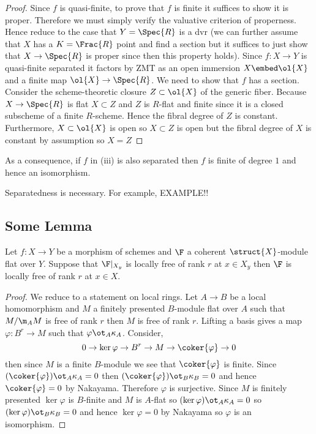\documentclass[12pt]{article}
\begin{document}
\begin{proof}
Since $f$ is quasi-finite, to prove that $f$ is finite it suffices to show it is proper. Therefore we must simply verify the valuative criterion of properness. Hence reduce to the case that $Y = \Spec{R}$ is a dvr (we can further assume that $X$ has a $K = \Frac{R}$ point and find a section but it suffices to just show that $X \to \Spec{R}$ is proper since then this property holds). Since $f : X \to Y$ is quasi-finite separated it factors by ZMT as an open immersion $X \embed \ol{X}$ and a finite map $\ol{X} \to \Spec{R}$. We need to show that $f$ has a section. Consider the scheme-theoretic closure $Z \subset \ol{X}$ of the generic fiber. Because $X \to \Spec{R}$ is flat $X \subset Z$ and $Z$ is $R$-flat and finite since it is a closed subscheme of a finite $R$-scheme. Hence the fibral degree of $Z$ is constant. Furthermore, $X \subset \ol{X}$ is open so $X \subset Z$ is open but the fibral degree of $X$ is constant by assumption so $X = Z$ 
\end{proof}

As a consequence, if $f$ in (iii) is also separated then $f$ is finite of degree $1$ and hence an isomorphism.

\begin{rmk}
Separatedness is necessary. For example, EXAMPLE!!
\end{rmk}

\subsection{Some Lemma}

\begin{lemma}
Let $f : X \to Y$ be a morphism of schemes and $\F$ a coherent $\struct{X}$-module flat over $Y$. Suppose that $\F|_{X_y}$ is locally free of rank $r$ at $x \in X_y$ then $\F$ is locally free of rank $r$ at $x \in X$.
\end{lemma}

\begin{proof}
We reduce to a statement on local rings. Let $A \to B$ be a local homomorphism and $M$ a finitely presented $B$-module flat over $A$ such that $M / \m_A M$ is free of rank $r$ then $M$ is free of rank $r$. Lifting a basis gives a map $\varphi : B^r \to M$ such that $\varphi \ot_A \kappa_A$. Consider,
\[ 0 \to \ker{\varphi} \to B^r \to M \to \coker{\varphi} \to 0 \]
then since $M$ is a finite $B$-module we see that $\coker{\varphi}$ is finite. Since $(\coker{\varphi}) \ot_A \kappa_A = 0$ then $(\coker{\varphi}) \ot_B \kappa_B = 0$ and hence $\coker{\varphi} = 0$ by Nakayama. Therefore $\varphi$ is surjective. Since $M$ is finitely presented $\ker{\varphi}$ is $B$-finite and $M$ is $A$-flat so $(\ker{\varphi}) \ot_A \kappa_A = 0$ so $(\ker{\varphi}) \ot_B \kappa_B = 0$ and hence $\ker{\varphi} = 0$ by Nakayama so $\varphi$ is an isomorphism.
\end{proof}
\end{document}
